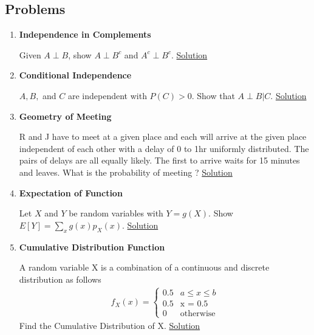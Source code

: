 \documentclass[11pt, a4paper]{article}
\begin{document}
    \subsection{Problems}
    \begin{enumerate}
    \item \hypertarget{q_indcomp}{\textbf{Independence in Complements}}\newline
    Given $A \perp B$, show $A \perp B^{c}$ and $A^{c} \perp B^{c}$. \hyperlink{a_indcomp}{Solution}

    \item \hypertarget{q_conind}{\textbf{Conditional Independence}}\newline
    $A,B,$ and $C$ are independent with $P(C) > 0$. Show that $A\perp B |C$. \hyperlink{a_conind}{Solution}

    \item \hypertarget{q_geomeet}{\textbf{Geometry of Meeting}}\newline
    R and J have to meet at a given place and each will arrive at the given place independent of each other with a delay of 0 to 1hr uniformly distributed. The pairs of delays are all equally likely. The first to arrive waits for 15 minutes and leaves. What is the probability of meeting ? \hyperlink{a_geomeet}{Solution}
    
    \item \hypertarget{q_expfn}{\textbf{Expectation of Function}}\newline
    Let $X$ and $Y$ be random variables with $Y = g(X)$. Show $E[Y] = \sum_{x}g(x)p_{X}(x)$. \hyperlink{a_expfn}{Solution}

    \item \hypertarget{q_cumuldistfn}{\textbf{Cumulative Distribution Function}}\newline
    A random variable X is a combination of a continuous and discrete distribution as follows
    \begin{align*}
        f_{X}(x) = \begin{cases} 0.5 &\mbox{$a \leq x \leq b$}\\
                                 0.5 &\mbox{x = 0.5}\\
                                 0 &\mbox{otherwise} \end{cases}
    \end{align*}
    Find the Cumulative Distribution of X. \hyperlink{a_cumuldistfn}{Solution}
    

\end{enumerate}
\end{document}
